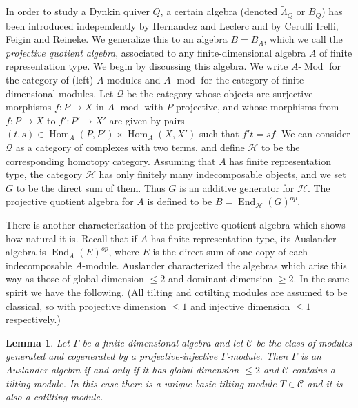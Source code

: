 \documentclass[11pt,a4paper]{amsart}
\theoremstyle{plain}
\newtheorem{lem}[thm]{Lemma}
\theoremstyle{definition}
\begin{document}
In order to study a Dynkin quiver $Q$, a certain algebra (denoted $\tilde\Lambda_Q$ or $B_Q$) has been introduced independently by Hernandez and Leclerc \cite{HL} and by Cerulli Irelli, Feigin and Reineke.
We generalize this to an algebra $B=B_A$, which we call the \emph{projective quotient algebra}, associated to any finite-dimensional algebra $A$ of finite representation type.
We begin by discussing this algebra.
We write $A$-$\operatorname{Mod}$ for the category of (left) $A$-modules and $A$-$\operatorname{mod}$ for
the category of finite-dimensional modules.
Let ${\mathcal{Q}}$ be the category whose objects are surjective morphisms $f\colon P\to X$
in $A$-$\operatorname{mod}$ with $P$ projective, and whose morphisms 
from $f\colon P\to X$ to $f' \colon P' \to X'$ are given by pairs 
$(t,s)\in \operatorname{Hom}_A(P,P') \times \operatorname{Hom}_A(X, X' )$ such that $f'  t = s  f$.  
We can consider ${\mathcal{Q}}$ as a category of complexes with two terms,
and define ${\mathcal{H}}$ to be the corresponding homotopy category.
Assuming that $A$ has finite representation type, the category ${\mathcal{H}}$ has
only finitely many indecomposable objects, and we set $G$ to be the direct sum of them. Thus
$G$ is an additive generator for ${\mathcal{H}}$. The projective quotient algebra for $A$ 
is defined to be $B = \operatorname{End}_{\mathcal{H}}(G)^{op}$.

There is another characterization of the projective quotient algebra which shows how natural it is.
Recall that if $A$ has finite representation type, its Auslander algebra is $\operatorname{End}_A(E)^{op}$,
where $E$ is the direct sum of one copy of each indecomposable $A$-module.
Auslander \cite{AusII} characterized the algebras which arise this way as those 
of global dimension $\le 2$ and dominant dimension $\ge 2$.
In the same spirit we have the following. 
(All tilting and cotilting modules are assumed
to be classical, so with projective dimension $\le 1$ and 
injective dimension $\le 1$ respectively.)

\begin{lem}
\label{l:introlem}
Let $\Gamma$ be a finite-dimensional algebra
and let ${\mathcal{C}}$ be the class of modules generated and cogenerated by a 
projective-injective $\Gamma$-module. Then
$\Gamma$ is an Auslander algebra if and only if it has global
dimension $\le 2$ and
${\mathcal{C}}$ contains a tilting module.
In this case there is a unique basic tilting module $T \in {\mathcal{C}}$ and it is also a cotilting module.
\end{lem}
\end{document}
